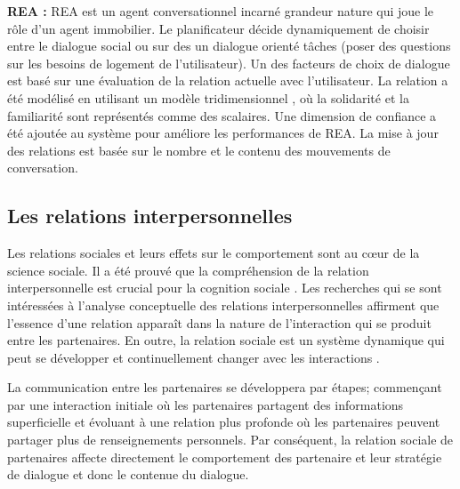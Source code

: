 \documentclass[a4paper,french]{article}
\begin{document}
\par \textbf{REA : } REA \cite{bickmore2005establishing} est un agent conversationnel incarné grandeur nature qui joue le rôle d'un agent immobilier. Le planificateur décide dynamiquement  de choisir entre le dialogue social  ou sur des un dialogue orienté tâches (poser des questions sur les besoins de logement de l'utilisateur). Un des facteurs de choix de dialogue est basé sur une évaluation de la relation actuelle avec l'utilisateur. La relation a été modélisé en utilisant un modèle tridimensionnel \cite{svennevig2000getting}, où la solidarité et la familiarité sont représentés comme des scalaires. Une dimension de confiance a été ajoutée au système pour améliore les performances de REA. La  mise à jour des  relations est basée sur le nombre et le contenu des mouvements de conversation.

\subsection{Les relations interpersonnelles}
\par Les relations sociales et leurs effets sur le comportement sont au cœur de la science sociale. Il a été prouvé que la compréhension de la relation interpersonnelle est crucial pour la cognition sociale \cite{reis2000relationship}. Les recherches qui se sont intéressées à l'analyse conceptuelle des relations interpersonnelles affirment que l'essence d'une relation apparaît dans la nature de l'interaction qui se produit entre les partenaires. En outre, la relation sociale est un système dynamique qui peut se développer et continuellement changer avec les interactions \cite {reis2000relationship,svennevig2000getting}.
\par La communication entre les partenaires se développera par étapes; commençant par une interaction initiale où les partenaires partagent des informations superficielle et évoluant à une relation plus profonde où les partenaires peuvent partager plus de renseignements personnels. Par conséquent, la relation sociale de partenaires affecte directement le comportement des partenaire et leur stratégie de dialogue et donc le contenue du dialogue.
\end{document}
